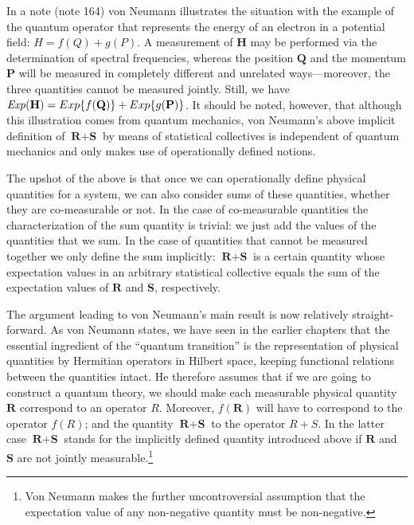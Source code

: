 \documentclass[12pt]{article}
\begin{document}
In a note (note 164) von Neumann illustrates the situation with the example of the quantum operator that represents the energy of an electron in a potential field: $H = f(Q) + g(P)$. A measurement of $\textbf{H}$ may be performed via the determination of spectral frequencies, whereas the position $\textbf{Q}$ and the momentum $\textbf{P}$ will be measured in completely different and unrelated ways---moreover, the three quantities cannot be measured jointly. Still, we have ${\it Exp}(\textbf{H}) = Exp\{f(\textbf{Q})\} + Exp\{g(\textbf{P})\}$. It should be noted, however, that although this illustration comes from quantum mechanics, von Neumann's above implicit definition of $\textbf{R} + \textbf{S}$ by means of statistical collectives is independent of quantum mechanics and only makes use of operationally defined notions.

The upshot of the above is that once we can operationally define physical quantities for a system, we can also consider sums of these quantities, whether they are co-measurable or not. In the case of co-measurable quantities the characterization of the sum quantity is trivial: we just add the values of the quantities that we sum. In the case of quantities that cannot be measured together we only define the sum implicitly: $\textbf{R} + \textbf{S}$ is a certain quantity whose expectation values in an arbitrary statistical collective equals the sum of the expectation values of $\textbf{R}$ and $\textbf{S}$, respectively.

The argument leading to von Neumann's main result is now relatively straight-forward. As von Neumann states, we have seen in the earlier chapters that the essential ingredient of the ``quantum transition'' is the representation of physical quantities by Hermitian operators in Hilbert space, keeping functional relations between the quantities intact. He therefore assumes that if we are going to construct a quantum theory, we should make each measurable physical quantity $\textbf{R}$ correspond to an operator $R$. Moreover, $f(\textbf{R})$ will have to correspond to the operator $f(R)$; and the quantity $\textbf{R} + \textbf{S}$ to the operator $R + S$. In the latter case $\textbf{R} + \textbf{S}$ stands for the implicitly defined quantity introduced above if $\textbf{R}$ and $\textbf{S}$ are not jointly measurable.\footnote{Von Neumann makes the further uncontroversial assumption that the expectation value of any non-negative quantity must be non-negative.}
\end{document}
